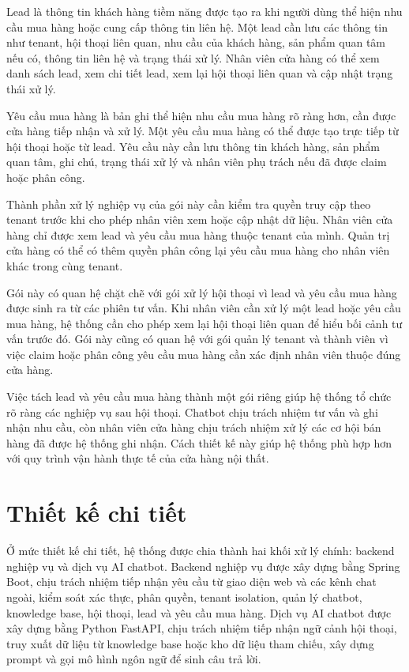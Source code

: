 \documentclass[../DoAn.tex]{subfiles}
\begin{document}
Lead là thông tin khách hàng tiềm năng được tạo ra khi người dùng thể hiện nhu cầu mua hàng hoặc cung cấp thông tin liên hệ. Một lead cần lưu các thông tin như tenant, hội thoại liên quan, nhu cầu của khách hàng, sản phẩm quan tâm nếu có, thông tin liên hệ và trạng thái xử lý. Nhân viên cửa hàng có thể xem danh sách lead, xem chi tiết lead, xem lại hội thoại liên quan và cập nhật trạng thái xử lý.

Yêu cầu mua hàng là bản ghi thể hiện nhu cầu mua hàng rõ ràng hơn, cần được cửa hàng tiếp nhận và xử lý. Một yêu cầu mua hàng có thể được tạo trực tiếp từ hội thoại hoặc từ lead. Yêu cầu này cần lưu thông tin khách hàng, sản phẩm quan tâm, ghi chú, trạng thái xử lý và nhân viên phụ trách nếu đã được claim hoặc phân công.

Thành phần xử lý nghiệp vụ của gói này cần kiểm tra quyền truy cập theo tenant trước khi cho phép nhân viên xem hoặc cập nhật dữ liệu. Nhân viên cửa hàng chỉ được xem lead và yêu cầu mua hàng thuộc tenant của mình. Quản trị cửa hàng có thể có thêm quyền phân công lại yêu cầu mua hàng cho nhân viên khác trong cùng tenant.

Gói này có quan hệ chặt chẽ với gói xử lý hội thoại vì lead và yêu cầu mua hàng được sinh ra từ các phiên tư vấn. Khi nhân viên cần xử lý một lead hoặc yêu cầu mua hàng, hệ thống cần cho phép xem lại hội thoại liên quan để hiểu bối cảnh tư vấn trước đó. Gói này cũng có quan hệ với gói quản lý tenant và thành viên vì việc claim hoặc phân công yêu cầu mua hàng cần xác định nhân viên thuộc đúng cửa hàng.

Việc tách lead và yêu cầu mua hàng thành một gói riêng giúp hệ thống tổ chức rõ ràng các nghiệp vụ sau hội thoại. Chatbot chịu trách nhiệm tư vấn và ghi nhận nhu cầu, còn nhân viên cửa hàng chịu trách nhiệm xử lý các cơ hội bán hàng đã được hệ thống ghi nhận. Cách thiết kế này giúp hệ thống phù hợp hơn với quy trình vận hành thực tế của cửa hàng nội thất.

\section{Thiết kế chi tiết}

Ở mức thiết kế chi tiết, hệ thống được chia thành hai khối xử lý chính: backend nghiệp vụ và dịch vụ AI chatbot. Backend nghiệp vụ được xây dựng bằng Spring Boot, chịu trách nhiệm tiếp nhận yêu cầu từ giao diện web và các kênh chat ngoài, kiểm soát xác thực, phân quyền, tenant isolation, quản lý chatbot, knowledge base, hội thoại, lead và yêu cầu mua hàng. Dịch vụ AI chatbot được xây dựng bằng Python FastAPI, chịu trách nhiệm tiếp nhận ngữ cảnh hội thoại, truy xuất dữ liệu từ knowledge base hoặc kho dữ liệu tham chiếu, xây dựng prompt và gọi mô hình ngôn ngữ để sinh câu trả lời.
\end{document}
